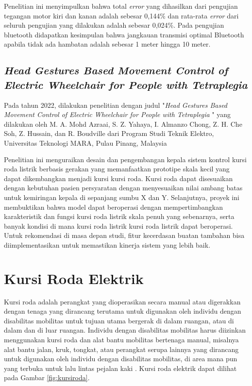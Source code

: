 Penelitian ini menyimpulkan bahwa total \emph{error} yang dihasilkan dari pengujian tegangan motor kiri dan kanan adalah sebesar 0,144\% dan rata-rata \emph{error} dari seluruh pengujian yang dilakukan adalah sebesar 0,024\%. Pada pengujian bluetooth didapatkan kesimpulan bahwa jangkauan transmisi optimal Bluetooth apabila tidak ada hambatan adalah sebesar 1 meter hingga 10 meter.

\subsection{\textit{Head Gestures Based Movement Control of Electric Wheelchair for People with Tetraplegia }}

Pada tahun 2022, dilakukan penelitian dengan judul "\textit{Head Gestures Based Movement Control of Electric Wheelchair for People with Tetraplegia }" yang dilakukan oleh M. A. Mohd Azraai, S. Z. Yahaya, I. Almanzo Chong, Z. H. Che Soh, Z. Hussain, dan R. Boudville dari Program Studi Teknik Elektro, Universitas Teknologi MARA, Pulau Pinang, Malaysia \parencite{9935646}

Penelitian ini menguraikan desain dan pengembangan kepala sistem kontrol kursi roda listrik berbasis gerakan yang memanfaatkan prototipe skala kecil yang dapat dikembangkan menjadi kursi 
kursi roda. Kursi roda dapat disesuaikan dengan kebutuhan pasien persyaratan dengan menyesuaikan nilai ambang batas untuk kemiringan kepala di sepanjang sumbu X dan Y. Selanjutnya, proyek ini membuktikan bahwa model dapat beroperasi dengan mempertimbangkan karakteristik dan fungsi kursi roda listrik skala penuh yang sebenarnya, serta banyak kondisi di mana kursi roda listrik kursi roda listrik dapat beroperasi. Untuk rekomendasi di masa depan studi, fitur kecerdasan buatan tambahan bisa diimplementasikan untuk memastikan kinerja sistem yang lebih baik.

\section{Kursi Roda Elektrik}
\label{subsec:kursirodaelektrik}

Kursi roda adalah perangkat yang dioperasikan secara manual atau digerakkan dengan tenaga yang dirancang terutama untuk digunakan oleh individu dengan disabilitas mobilitas untuk tujuan utama bergerak di dalam ruangan, atau di dalam dan di luar ruangan.  Individu dengan disabilitas mobilitas harus diizinkan menggunakan kursi roda dan alat bantu mobilitas bertenaga manual, misalnya alat bantu jalan, kruk, tongkat, atau perangkat serupa lainnya yang dirancang untuk digunakan oleh individu dengan disabilitas mobilitas, di area mana pun yang terbuka untuk lalu lintas pejalan kaki \parencite{ADA_2023}. Kursi roda elektrik dapat dilihat pada Gambar \ref{fig:kursiroda}.

